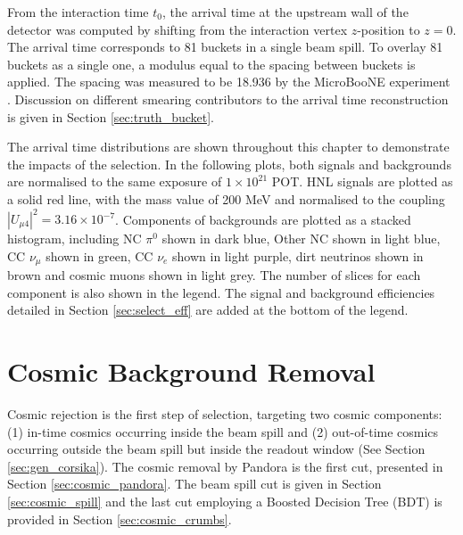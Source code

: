 From the interaction time $t_0$, the arrival time at the upstream wall of the detector was computed by shifting from the interaction vertex $z$-position to $z = 0$.
The arrival time corresponds to 81 buckets in a single beam spill.
To overlay 81 buckets as a single one, a modulus equal to the spacing between buckets is applied.
The spacing was measured to be 18.936 by the MicroBooNE experiment \cite{uboone_ns}.
Discussion on different smearing contributors to the arrival time reconstruction is given in Section \ref{sec:truth_bucket}.

The arrival time distributions are shown throughout this chapter to demonstrate the impacts of the selection.
In the following plots, both signals and backgrounds are normalised to the same exposure of $1 \times 10^{21}$ POT.
HNL signals are plotted as a solid red line, with the mass value of 200 MeV and normalised to the coupling $|U_{\mu4}|^2 = 3.16 \times 10^{-7}$.
Components of backgrounds are plotted as a stacked histogram, including NC $\pi^0$ shown in dark blue, Other NC shown in light blue, CC $\nu_{\mu}$ shown in green, CC $\nu_e$ shown in light purple, dirt neutrinos shown in brown and cosmic muons shown in light grey.
The number of slices for each component is also shown in the legend.
The signal and background efficiencies detailed in Section \ref{sec:select_eff} are added at the bottom of the legend.


\section{Cosmic Background Removal}
\label{sec:cosmic_rej}

Cosmic rejection is the first step of selection, targeting two cosmic components: (1) in-time cosmics occurring inside the beam spill and (2) out-of-time cosmics occurring outside the beam spill but inside the readout window (See Section \ref{sec:gen_corsika}).  
The cosmic removal by Pandora is the first cut, presented in Section \ref{sec:cosmic_pandora}.
The beam spill cut is given in Section \ref{sec:cosmic_spill} and the last cut employing a Boosted Decision Tree (BDT) is provided in Section \ref{sec:cosmic_crumbs}.

